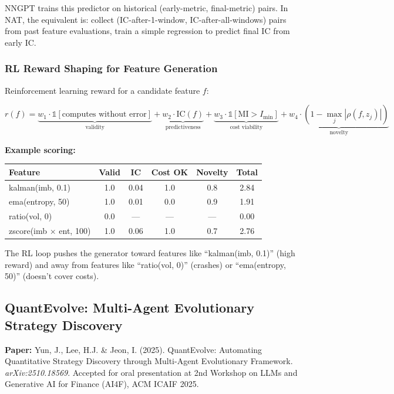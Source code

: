 \documentclass[11pt,a4paper]{article}
\begin{document}
NNGPT trains this predictor on historical (early-metric, final-metric) pairs. In NAT, the equivalent is: collect (IC-after-1-window, IC-after-all-windows) pairs from past feature evaluations, train a simple regression to predict final IC from early IC.

\subsubsection{RL Reward Shaping for Feature Generation}

Reinforcement learning reward for a candidate feature $f$:

\begin{equation}
r(f) = \underbrace{w_1 \cdot \mathbb{1}[\text{computes without error}]}_{\text{validity}} + \underbrace{w_2 \cdot \text{IC}(f)}_{\text{predictiveness}} + \underbrace{w_3 \cdot \mathbb{1}[\text{MI} > I_{\min}]}_{\text{cost viability}} + \underbrace{w_4 \cdot (1 - \max_j |\rho(f, z_j)|)}_{\text{novelty}}
\end{equation}

\textbf{Example scoring:}

\begin{center}
\begin{tabular}{l c c c c c}
\hline
\textbf{Feature} & \textbf{Valid} & \textbf{IC} & \textbf{Cost OK} & \textbf{Novelty} & \textbf{Total} \\
\hline
kalman(imb, 0.1) & 1.0 & 0.04 & 1.0 & 0.8 & 2.84 \\
ema(entropy, 50) & 1.0 & 0.01 & 0.0 & 0.9 & 1.91 \\
ratio(vol, 0) & 0.0 & --- & --- & --- & 0.00 \\
zscore(imb $\times$ ent, 100) & 1.0 & 0.06 & 1.0 & 0.7 & 2.76 \\
\hline
\end{tabular}
\end{center}

The RL loop pushes the generator toward features like ``kalman(imb, 0.1)'' (high reward) and away from features like ``ratio(vol, 0)'' (crashes) or ``ema(entropy, 50)'' (doesn't cover costs).


\subsection{QuantEvolve: Multi-Agent Evolutionary Strategy Discovery}

\textbf{Paper:} Yun, J., Lee, H.J. \& Jeon, I. (2025). QuantEvolve: Automating Quantitative Strategy Discovery through Multi-Agent Evolutionary Framework. \textit{arXiv:2510.18569}. Accepted for oral presentation at 2nd Workshop on LLMs and Generative AI for Finance (AI4F), ACM ICAIF 2025.
\end{document}
